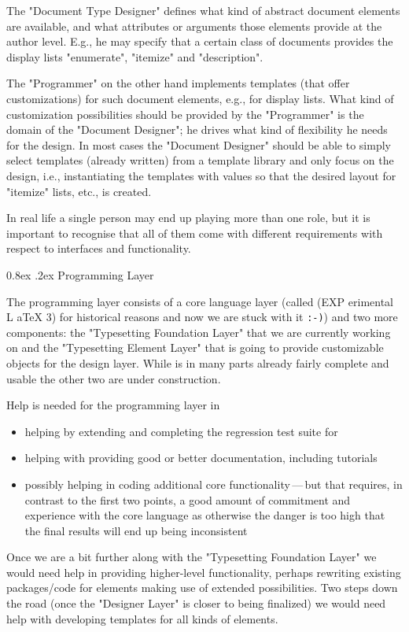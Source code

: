 \documentclass{ltnews}
\makeatletter
\def\Dash{\,---\,}
\newcommand{\@subheadingfont}{%
   \sffamily\slshape
   \let\LaTeX\cmssLaTeX\let\TeX\cmssTeX
}
\renewcommand{\subsection}{%
   \@startsection
      {subsection}{2}{\z@}{-1.3ex \@plus -1ex \@minus -.2ex}%
      {0.8ex \@plus.2ex}{\@subheadingfont}%
}
\makeatother
\begin{document}
The "Document Type Designer" defines what kind of abstract document elements are available, and what attributes or arguments those elements provide at the author level. E.g., he may specify that a certain class of documents provides the display lists "enumerate", "itemize" and "description".

The "Programmer" on the other hand implements templates (that offer customizations) for such document elements, e.g., for display lists. What kind of customization possibilities should be provided by the "Programmer" is the domain of the "Document Designer"; he drives what kind of flexibility he needs for the design. In most cases the "Document Designer" should be able to simply select templates (already written) from a template library and only focus on the design, i.e., instantiating the templates with values so that the desired layout for "itemize" lists, etc., is created.

In real life a single person may end up playing more than one role, but it is important to recognise that all of them come with different requirements with respect to interfaces and functionality.

\subsection{Programming Layer}

The programming layer consists of a core language layer (called  (EXP erimental L aTeX 3) for historical reasons and now we are stuck with it \texttt{:-)}) and two more components: the "Typesetting Foundation Layer" that we are currently working on and the "Typesetting Element Layer" that is going to provide customizable objects for the design layer. While  is in many parts already fairly complete and usable the other two are under construction.

Help is needed for the programming layer in
\begin{itemize}
\item helping by extending and completing the regression test suite for 
\item helping with providing good or better documentation, including tutorials
\item possibly helping in coding additional core functionality\Dash but that requires, in contrast to the first two points, a good amount of commitment and experience with the core language as otherwise the danger is too high that the final results will end up being inconsistent
\end{itemize}
Once we are a bit further along with the "Typesetting Foundation Layer" we would need help in
providing higher-level functionality, perhaps rewriting existing packages/code for elements making use of extended possibilities.
Two steps down the road (once the "\mbox{Designer} Layer" is closer to being finalized) we would need help with developing templates for all kinds of elements.
\end{document}
